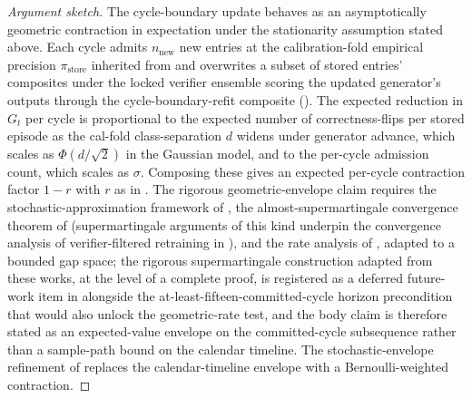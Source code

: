 \begin{proof}[Argument sketch]
The cycle-boundary update behaves as an asymptotically geometric contraction in expectation under the stationarity assumption stated above. Each cycle admits $n_{\text{new}}$ new entries at the calibration-fold empirical precision $\pi_{\text{store}}$ inherited from  and overwrites a subset of stored entries' composites under the locked verifier ensemble scoring the updated generator's outputs through the cycle-boundary-refit composite (). The expected reduction in $G_{t}$ per cycle is proportional to the expected number of correctness-flips per stored episode as the cal-fold class-separation $d$ widens under generator advance, which scales as $\Phi(d/\sqrt{2})$ in the Gaussian model, and to the per-cycle admission count, which scales as $\sigma$. Composing these gives an expected per-cycle contraction factor $1-r$ with $r$ as in . The rigorous geometric-envelope claim requires the stochastic-approximation framework of \cite{robbins1951stochastic}, the almost-supermartingale convergence theorem of \cite{robbins1971convergence} (supermartingale arguments of this kind underpin the convergence analysis of verifier-filtered retraining in \cite{fu2025collapse}), and the rate analysis of \cite{polyak1990new}, adapted to a bounded gap space; the rigorous supermartingale construction adapted from these works, at the level of a complete proof, is registered as a deferred future-work item in  alongside the at-least-fifteen-committed-cycle horizon precondition that would also unlock the geometric-rate test, and the body claim is therefore stated as an expected-value envelope on the committed-cycle subsequence rather than a sample-path bound on the calendar timeline. The stochastic-envelope refinement of  replaces the calendar-timeline envelope with a Bernoulli-weighted contraction.
\end{proof}

